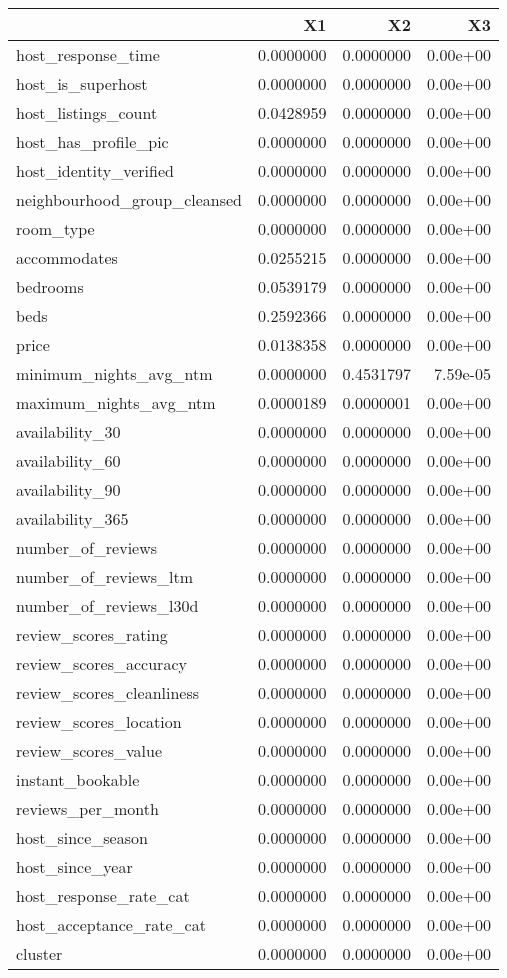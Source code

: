 
\begin{tabular}[t]{lrrr}
\toprule
  & X1 & X2 & X3\\
\midrule
host\_response\_time & 0.0000000 & 0.0000000 & 0.00e+00\\
host\_is\_superhost & 0.0000000 & 0.0000000 & 0.00e+00\\
host\_listings\_count & 0.0428959 & 0.0000000 & 0.00e+00\\
host\_has\_profile\_pic & 0.0000000 & 0.0000000 & 0.00e+00\\
host\_identity\_verified & 0.0000000 & 0.0000000 & 0.00e+00\\
\addlinespace
neighbourhood\_group\_cleansed & 0.0000000 & 0.0000000 & 0.00e+00\\
room\_type & 0.0000000 & 0.0000000 & 0.00e+00\\
accommodates & 0.0255215 & 0.0000000 & 0.00e+00\\
bedrooms & 0.0539179 & 0.0000000 & 0.00e+00\\
beds & 0.2592366 & 0.0000000 & 0.00e+00\\
\addlinespace
price & 0.0138358 & 0.0000000 & 0.00e+00\\
minimum\_nights\_avg\_ntm & 0.0000000 & 0.4531797 & 7.59e-05\\
maximum\_nights\_avg\_ntm & 0.0000189 & 0.0000001 & 0.00e+00\\
availability\_30 & 0.0000000 & 0.0000000 & 0.00e+00\\
availability\_60 & 0.0000000 & 0.0000000 & 0.00e+00\\
\addlinespace
availability\_90 & 0.0000000 & 0.0000000 & 0.00e+00\\
availability\_365 & 0.0000000 & 0.0000000 & 0.00e+00\\
number\_of\_reviews & 0.0000000 & 0.0000000 & 0.00e+00\\
number\_of\_reviews\_ltm & 0.0000000 & 0.0000000 & 0.00e+00\\
number\_of\_reviews\_l30d & 0.0000000 & 0.0000000 & 0.00e+00\\
\addlinespace
review\_scores\_rating & 0.0000000 & 0.0000000 & 0.00e+00\\
review\_scores\_accuracy & 0.0000000 & 0.0000000 & 0.00e+00\\
review\_scores\_cleanliness & 0.0000000 & 0.0000000 & 0.00e+00\\
review\_scores\_location & 0.0000000 & 0.0000000 & 0.00e+00\\
review\_scores\_value & 0.0000000 & 0.0000000 & 0.00e+00\\
\addlinespace
instant\_bookable & 0.0000000 & 0.0000000 & 0.00e+00\\
reviews\_per\_month & 0.0000000 & 0.0000000 & 0.00e+00\\
host\_since\_season & 0.0000000 & 0.0000000 & 0.00e+00\\
host\_since\_year & 0.0000000 & 0.0000000 & 0.00e+00\\
host\_response\_rate\_cat & 0.0000000 & 0.0000000 & 0.00e+00\\
\addlinespace
host\_acceptance\_rate\_cat & 0.0000000 & 0.0000000 & 0.00e+00\\
cluster & 0.0000000 & 0.0000000 & 0.00e+00\\
\bottomrule
\end{tabular}